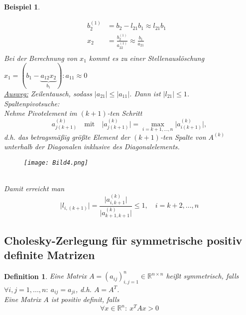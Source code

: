 \documentclass[12pt]{article}
\theoremstyle{break}
\newtheorem{definition}[theorem]{Definition}
\newtheorem{example}[theorem]{Beispiel}
\begin{document}
\begin{example}
\begin{description}
\begin{align*}
    b_2^{(1)} &= b_2 - l_{21} b_1 \approx l_{21}b_1 &\\
    x_2 &= \frac{b_2^{(1)}}{a_{22}^{(1)}} \approx \frac{b_1}{a_{21}} &\\
    \end{align*}
    Bei der Berechnung von $x_1$ kommt es zu einer Stellenauslöschung $x_1 = {(b_1 - \underbrace{a_{12} x_2}_{b_1})}:{a_{11}} \approx 0$\\
    \underline{Ausweg:} Zeilentausch, sodass $\vert a_{21} \vert \leq \vert a_{11} \vert $. Dann ist $\vert l_{21} \vert \leq 1$.\\
    Spaltenpivotsuche: \\
    Nehme Pivotelement im $(k+1)$-ten Schritt
    $$a_{j(k+1)}^{(k)} \quad \text{mit} \quad \vert a_{j(k+1)}^{(k)} \vert = \max_{i=k+1,...,n} \vert a_{i(k+1)}^{(k)} \vert, $$
    d.h. das betragsmäßig größte Element der $(k+1)$-ten Spalte von $A^{(k)}$ unterhalb der Diagonalen inklusive des Diagonalelements. \\
    \begin{figure}[!htb]
    \centering
    \texttt{[image: Bild4.png]}
    \end{figure}\\
    Damit erreicht man
    $$ \vert l_{i, (k+1)} \vert = \frac{\vert a_{i, k+1}^{(k)} \vert }{ \vert a_{k+1, k+1}^{(k)} \vert} \leq 1, \quad i=k+2,...,n$$
\end{description}
\end{example}

\subsection{Cholesky-Zerlegung für symmetrische positiv definite Matrizen}

\begin{definition}
Eine Matrix $A = (a_{ij})_{i,j=1}^n \in \mathbb{R}^{n\times n}$ heißt symmetrisch, falls $\forall i,j = 1,...,n: \medspace a_{ij} = a_{ji}$, d.h. $A = A^T$.\\
Eine Matrix $A$ ist positiv definit, falls 
$$\forall x \in \mathbb{R}^n: \medspace x^T Ax > 0$$
\end{definition}
\end{document}
